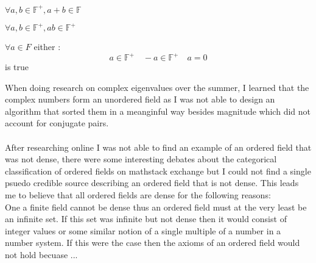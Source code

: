 \documentclass[11pt]{article}
\theoremstyle{definition}  %
\begin{document}
\begin{enumerate }
  \item $\forall a, b \in \mathbb{F}^+ , a+b \in \mathbb{F}$
  \item $\forall a,b \in \mathbb{F}^+, ab\in \mathbb{F}^+$
  \item $\forall a \in F$ either :
  \[
    a\in \mathbb{F}^+ \quad -a \in \mathbb{F}^+ \quad a=0
  \]
  is true
\end{enumerate }
When doing research on complex eigenvalues over the summer, I learned that the complex numbers form an unordered field as I was not able to design an algorithm that sorted them in a meanginful way besides magnitude which did not account for conjugate pairs. \\\\
After researching online I was not able to find an example of an ordered field that was not dense, there were some interesting debates about the categorical classification of ordered fields on mathstack exchange but I could not find a single psuedo credible source describing an ordered field that is not dense. This leads me to believe that all ordered fields are dense for the following reasons: \\
One a finite field cannot be dense thus an ordered field must at the very least be an infinite set. If this set was infinite but not dense then it would consist of integer values or some similar notion of a single multiple of a number in a number system. If this were the case then the axioms of an ordered field would not hold becuase ...
\end{document}
